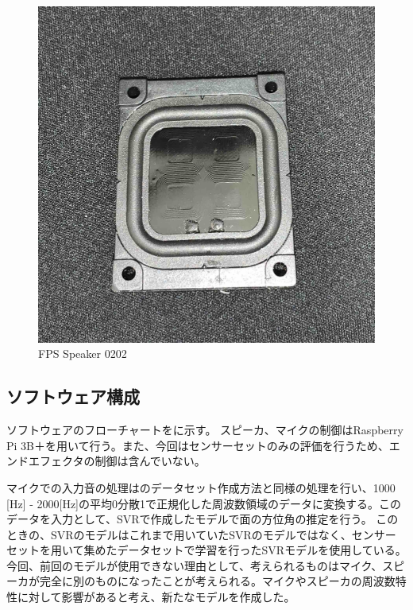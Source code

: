 \begin{figure}[tb]
  \begin{center}
  \vspace{1zh}
    \includegraphics[width=0.7\linewidth]{images/5_fps0202.jpg}   
  \end{center}
  \caption{FPS Speaker 0202}
  \label{fig:hand_hard_fps}
\end{figure}


\subsection{ソフトウェア構成}
\label{sec:soft_system}
ソフトウェアのフローチャートをに示す。
スピーカ、マイクの制御はRaspberry Pi 3B＋を用いて行う。また、今回はセンサーセットのみの評価を行うため、エンドエフェクタの制御は含んでいない。

マイクでの入力音の処理はのデータセット作成方法と同様の処理を行い、1000 [Hz] - 2000[Hz]の平均0分散1で正規化した周波数領域のデータに変換する。このデータを入力として、SVRで作成したモデルで面の方位角の推定を行う。
このときの、SVRのモデルはこれまで用いていたSVRのモデルではなく、センサーセットを用いて集めたデータセットで学習を行ったSVRモデルを使用している。今回、前回のモデルが使用できない理由として、考えられるものはマイク、スピーカが完全に別のものになったことが考えられる。マイクやスピーカの周波数特性に対して影響があると考え、新たなモデルを作成した。

